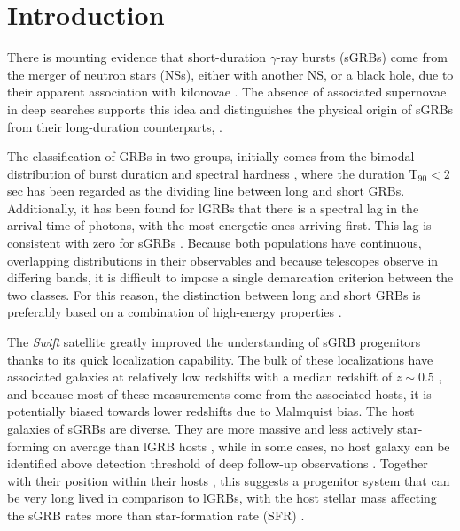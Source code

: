 \documentclass{aa}    %
\begin{document}

\maketitle

\section{Introduction}

There is mounting evidence that short-duration $\gamma$-ray bursts (sGRBs)
come from the merger of neutron stars (NSs), either with another NS, or a black
hole, due to their apparent association with kilonovae \citep{Barnes2013a,
	Tanvir2013b, Berger2013b, Yang2015, Jin2016, Rosswog2016}. The absence of associated
supernovae in deep searches \citep[e.g.][]{Hjorth2005a,Fox2005,Hjorth2005b, Kann2011}
supports this idea and distinguishes the physical origin of sGRBs from their
long-duration counterparts, \citep[albeit see also][]{Fynbo2006b, Valle2006, Gal-Yam2006}.

The classification of GRBs in two groups, initially comes from the bimodal
distribution of burst duration and spectral hardness \citep{Kouveliotou1993},
where the duration T$_{90} < 2$ sec has been regarded as the dividing line between long
and short GRBs. Additionally, it has been found for lGRBs that there is a
spectral lag in the arrival-time of photons, with the most energetic ones
arriving first. This lag is consistent with zero for sGRBs
\citep{Norris2006}. Because both populations have continuous, overlapping
distributions in their observables and because telescopes observe in differing
bands, it is difficult to impose a single demarcation criterion between the two
classes. For this reason, the distinction between long and short GRBs is
preferably based on a combination of high-energy properties \citep{Zhang2009,
	Bromberg2012a, Bromberg2013}.

The \textit{Swift} satellite \citep{Gehrels2004} greatly improved the
understanding of sGRB progenitors thanks to its quick localization capability.
The bulk of these localizations have associated galaxies at relatively low
redshifts with a median redshift of $z\sim0.5$ \citep{Berger2014}, and because
most of these measurements come from the associated hosts, it is potentially
biased towards lower redshifts due to Malmquist bias. The host galaxies of sGRBs
are diverse. They are more massive and less actively star-forming on average
than lGRB hosts \citep{Fong2013b}, while in some cases, no host galaxy can be
identified above detection threshold of deep follow-up observations
\citep{Berger2010a, Tunnicliffe2014}. Together with their position within their
hosts \citep{Fong2013a}, this suggests a progenitor system that can be very long
lived in comparison to lGRBs, with the host stellar mass affecting the sGRB
rates more than star-formation rate (SFR) \citep{Berger2014}.
\end{document}
